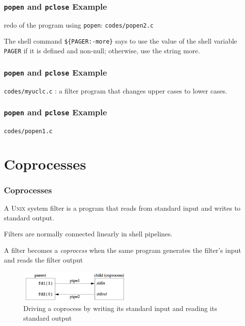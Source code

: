 \documentclass[newPxFont,sthlmFooter,nooffset]{beamer}
\begin{document}
\begin{frame}
  \frametitle{\texttt{popen} and \texttt{pclose} Example}
redo of the program using \texttt{popen}: \texttt{codes/popen2.c}

The shell command \texttt{\$\{PAGER:-more\}} says to use the value of the shell variable
\texttt{PAGER} if it is defined and non-null; otherwise, use the string more.


\end{frame}



\begin{frame}[t, fragile]
  \frametitle{\texttt{popen} and \texttt{pclose} Example}
\texttt{codes/myuclc.c} : a filter program that changes upper cases to lower cases.


\end{frame}



\begin{frame}
  \frametitle{\texttt{popen} and \texttt{pclose} Example}
\texttt{codes/popen1.c}


\end{frame}



\section{Coprocesses}

\begin{frame}[t]
  \frametitle{Coprocesses}
A \textsc{Unix} system filter is a program that reads from standard input and writes to standard output.

Filters are normally connected linearly in shell pipelines.

A filter becomes a \textit{coprocess} when the same program generates the filter's input and reads the filter output

  \begin{figure}[h]
    \centering
    \includegraphics[width=0.5\textwidth]{./figures/fig15_16-driving.png}
    \caption{Driving a coprocess by writing its standard input and reading its standard output}
  \end{figure}


\end{frame}
\end{document}
